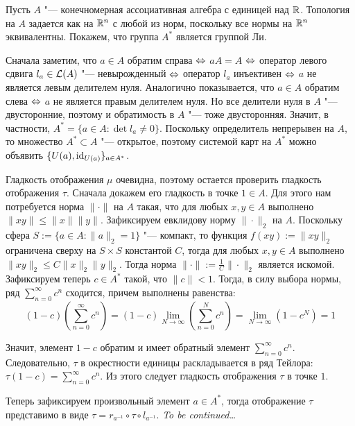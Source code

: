 \begin{example}
	Пусть $A$ "--- конечномерная ассоциативная алгебра с единицей над $\mathbb{R}$. Топология на $A$ задается как на $\mathbb{R}^n$ с любой из норм, поскольку все нормы на $\mathbb{R}^n$ эквивалентны. Покажем, что группа $A^*$ является группой Ли. 
	
	Сначала заметим, что $a \in A$ обратим справа $\Leftrightarrow$ $aA = A$ $\Leftrightarrow$ оператор левого сдвига $l_a \in \mathcal L(A)$ "--- невырожденный $\Leftrightarrow$ оператор $l_a$ инъективен $\Leftrightarrow$ $a$ не является левым делителем нуля. Аналогично показывается, что $a \in A$ обратим слева $\Leftrightarrow$ $a$ не является правым делителем нуля. Но все делители нуля в $A$ "--- двусторонние, поэтому и обратимость в $A$ "--- тоже двусторонняя. Значит, в частности, $A^* = \{a \in A: \det{l_a} \ne 0\}$. Поскольку определитель непрерывен на $A$, то множество $A^* \subset A$ "--- открытое, поэтому системой карт на $A^*$ можно объявить $\{U(a), \mathrm{id}_{U(a)}\}_{a \in A^*}$.
	
	Гладкость отображения $\mu$ очевидна, поэтому остается проверить гладкость отображения $\tau$. Сначала докажем его гладкость в точке $1 \in A$. Для этого нам потребуется норма $\| \cdot \|$ на $A$ такая, что для любых $x, y \in A$ выполнено $\|xy\| \le \|x\| \|y\|$. Зафиксируем евклидову норму $\| \cdot \|_2$ на $A$. Поскольку сфера $S := \{a \in A: \|a\|_2 = 1\}$ "--- компакт, то функция $f(xy) := \|xy\|_2$ ограничена сверху на $S \times S$ константой $C$, тогда для любых $x, y \in A$ выполнено $\|xy\|_2 \le C\|x\|_2\|y\|_2$. Тогда норма $\|\cdot\| := \frac{1}{C}\|\cdot\|_2$ является искомой. Зафиксируем теперь $c \in A^*$ такой, что $\|c\| < 1$. Тогда, в силу выбора нормы, ряд $\sum_{n=0}^\infty c^n$ сходится, причем выполнены равенства:
	\[(1-c)\left(\sum_{n=0}^\infty c^n\right) = (1-c)\lim_{N \to \infty}\left(\sum_{n=0}^Nc^n\right) = \lim_{N \to \infty}\left(1 - c^N\right) = 1\]
	
	Значит, элемент $1 - c$ обратим и имеет обратный элемент $\sum_{n=0}^\infty c^n$. Следовательно, $\tau$ в окрестности единицы раскладывается в ряд Тейлора: $\tau(1-c) = \sum_{n=0}^\infty c^n$.  Из этого следует гладкость отображения $\tau$ в точке $1$.
	
	Теперь зафиксируем произвольный элемент $a \in A^*$, тогда отображение $\tau$ представимо в виде $\tau = r_{a^{-1}} \circ \tau \circ l_{a^{-1}}$. \textit{To be continued\dots}
\end{example}

